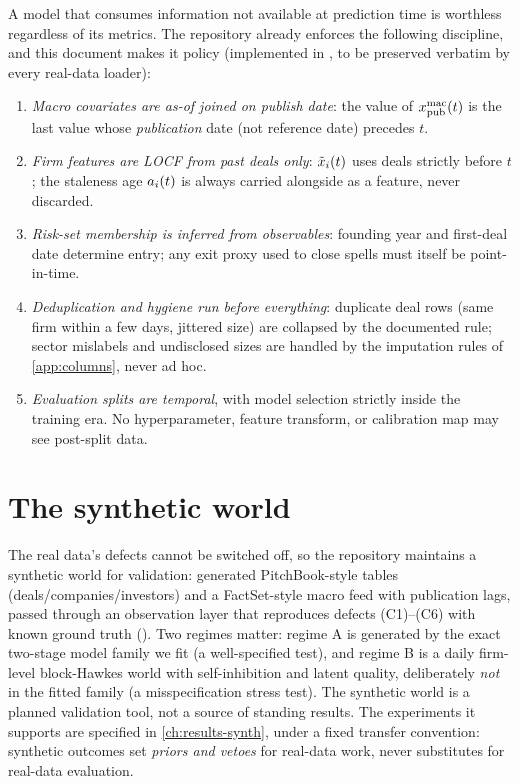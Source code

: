 A model that consumes information not available at prediction time is
worthless regardless of its metrics. The repository already enforces the
following discipline, and this document makes it policy (implemented in
, to be preserved verbatim by every real-data
loader):

\begin{protocol}\label{prot:ch02:pit}
\leavevmode
\begin{enumerate}[label=(\alph*)]
\item \emph{Macro covariates are as-of joined on publish date}: the value
of $x^{\mathrm{mac}}_{\mathrm{pub}}(t)$ is the last value whose
\emph{publication} date (not reference date) precedes $t$.
\item \emph{Firm features are LOCF from past deals only}: $\tilde{x}_i(t)$
uses deals strictly before $t$; the staleness age $a_i(t)$ is
always carried alongside as a feature, never discarded.
\item \emph{Risk-set membership is inferred from observables}: founding
year and first-deal date determine entry; any exit proxy used to close
spells must itself be point-in-time.
\item \emph{Deduplication and hygiene run before everything}: duplicate
deal rows (same firm within a few days, jittered size) are collapsed by
the documented rule; sector mislabels and undisclosed sizes are handled by
the imputation rules of \cref{app:columns}, never ad hoc.
\item \emph{Evaluation splits are temporal}, with model selection strictly
inside the training era. No hyperparameter, feature transform, or
calibration map may see post-split data.
\end{enumerate}
\end{protocol}

\section{The synthetic world}\label{ch02:sec:synthetic}

The real data's defects cannot be switched off, so the repository
maintains a synthetic world for validation: generated PitchBook-style
tables (deals/companies/investors) and a FactSet-style macro feed with
publication lags, passed through an observation layer that reproduces
defects (C1)--(C6) with known ground truth (). Two
regimes matter: regime A is generated by the exact two-stage model family
we fit (a well-specified test), and regime B is a daily firm-level
block-Hawkes world with self-inhibition and latent quality, deliberately
\emph{not} in the fitted family (a misspecification stress test). The
synthetic world is a planned validation tool, not a source of standing
results. The experiments it supports are specified in
\cref{ch:results-synth}, under a fixed transfer convention: synthetic
outcomes set \emph{priors and vetoes} for real-data work, never
substitutes for real-data evaluation.

